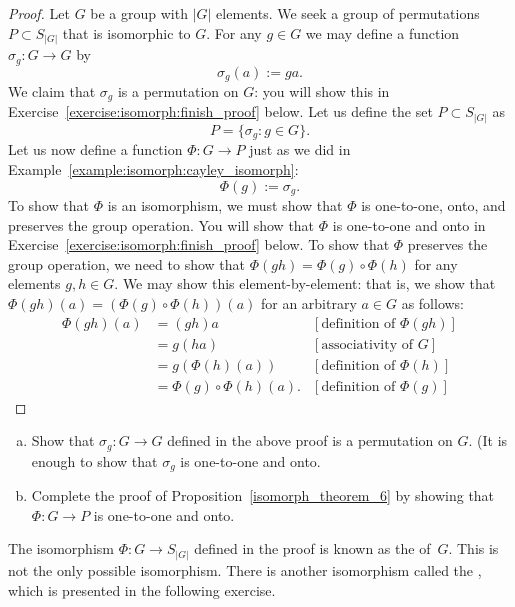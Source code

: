 \begin{proof}
Let $G$ be a group with $|G|$ elements.  We seek a group of permutations $P \subset S_{|G|}$ that is isomorphic to $G$.  For any $g \in G$ we may  define a  function $\sigma_g : G \rightarrow G$ by 
\[
\sigma_g(a) := ga.
\]
  We claim that $\sigma_g$ is a permutation on $G$: you will show this in Exercise~\ref{exercise:isomorph:finish_proof} below.  Let us define the set $P\subset S_{|G|}$ as
\[
P = \{ \sigma_g : g \in G \}.
\]
Let us now define a function $\Phi: G \rightarrow P$ just as we did in Example~\ref{example:isomorph:cayley_isomorph}:
\[ \Phi(g) := \sigma_g. \]
To show that $\Phi$ is an isomorphism, we must show that $\Phi$ is one-to-one, onto, and preserves the group operation. 
You will show that $\Phi$ is one-to-one and onto in Exercise~\ref{exercise:isomorph:finish_proof} below. To show that $\Phi$ preserves the group operation, we need to show that $\Phi(gh) = \Phi(g) \circ \Phi(h)$ for any elements $g, h \in G$. We may show this element-by-element: that is, we show that $\Phi(gh)(a) = (\Phi(g) \circ \Phi(h))(a)$ for an arbitrary $a \in G$ as follows:
\begin{align*}
 \Phi(gh)(a) &= (gh)a & [\text{definition of } \Phi(gh)]\\
&= g(ha) & [\text{associativity of }G]\\
 &= g(\Phi(h)(a)) & [\text{definition of } \Phi(h)]\\
 &=\Phi(g) \circ \Phi(h)(a). & [\text{definition of } \Phi(g)]
 \end{align*}
\end{proof}
\medskip

\begin{exercise}\label{exercise:isomorph:finish_proof}
\begin{enumerate}[(a)]
\item
Show that $\sigma_g : G \rightarrow G$ defined in the above proof is a permutation on $G$. (It is enough to show that $\sigma_g$ is one-to-one and onto. 
\item
Complete the proof of Proposition~\ref{isomorph_theorem_6} by showing that $\Phi:G \rightarrow P$ is one-to-one and onto. 
\end{enumerate}
\end{exercise}

The isomorphism $\Phi: G \rightarrow S_{|G|}$ defined in the proof is known as the  of~$G$. This is not the only possible isomorphism. There is another isomorphism called the , which is presented in the following exercise.

